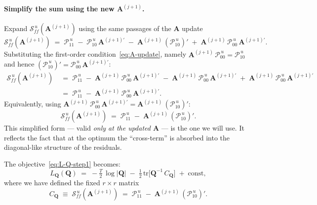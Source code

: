 \documentclass[11pt, a4paper, oneside]{article}
\newcommand{\mA}{\mathbf{A}}
\newcommand{\mQ}{\mathbf{Q}}
\begin{document}
\paragraph{Simplify the sum using the new $\mathbf{A}^{(j+1)}$.}
Expand $\mathcal{S}_{ff}^{\,u}(\mA^{(j+1)})$ using the same passages
of the $\mA$ update
\[
\mathcal{S}_{ff}^{\,u}(\mA^{(j+1)}) \;=\; \mathcal{P}_{11}^{\,u}
\;-\; \mathcal{P}_{10}^{\,u}\, \mA^{(j+1)\prime}
\;-\; \mA^{(j+1)}\, (\mathcal{P}_{10}^{\,u})'
\;+\; \mA^{(j+1)}\, \mathcal{P}_{00}^{\,u}\, \mA^{(j+1)\prime}.
\]
Substituting the first-order condition~\eqref{eq:A-update}, namely
$\mA^{(j+1)}\, \mathcal{P}_{00}^{\,u} = \mathcal{P}_{10}^{\,u}$ and
hence $(\mathcal{P}_{10}^{\,u})' = \mathcal{P}_{00}^{\,u}\, \mA^{(j+1)\prime}$:
\begin{align*}
\mathcal{S}_{ff}^{\,u}(\mA^{(j+1)})
&\;=\; \mathcal{P}_{11}^{\,u}
\;-\; \mA^{(j+1)}\, \mathcal{P}_{00}^{\,u}\, \mA^{(j+1)\prime}
\;-\; \mA^{(j+1)}\, \mathcal{P}_{00}^{\,u}\, \mA^{(j+1)\prime}
\;+\; \mA^{(j+1)}\, \mathcal{P}_{00}^{\,u}\, \mA^{(j+1)\prime} \\[2pt]
&\;=\; \mathcal{P}_{11}^{\,u} \;-\; \mA^{(j+1)}\, \mathcal{P}_{00}^{\,u}\, \mA^{(j+1)\prime}.
\end{align*}
Equivalently, using $\mA^{(j+1)}\, \mathcal{P}_{00}^{\,u}\, \mA^{(j+1)\prime} = \mA^{(j+1)}\, (\mathcal{P}_{10}^{\,u})'$:
\begin{equation}
\mathcal{S}_{ff}^{\,u}(\mA^{(j+1)}) \;=\; \mathcal{P}_{11}^{\,u} \;-\; \mA^{(j+1)}\, (\mathcal{P}_{10}^{\,u})'.
\label{eq:Sff-simplified}
\end{equation}
This simplified form — valid \emph{only at the updated $\mA$} — is the
one we will use. It reflects the fact that at the optimum the
``cross-term'' is absorbed into the diagonal-like structure of the
residuals.

The objective~\eqref{eq:L-Q-step1} becomes:
\[
L_{\mQ}(\mQ) \;=\; -\tfrac{T}{2}\,\log|\mQ| \;-\; \tfrac{1}{2}\,\mathrm{tr}\!\big[\mQ^{-1}\, C_{\mQ}\big]
\;+\; \text{const},
\]
where we have defined the fixed $r \times r$ matrix
\begin{equation}
C_{\mQ} \;\equiv\; \mathcal{S}_{ff}^{\,u}(\mA^{(j+1)}) \;=\; \mathcal{P}_{11}^{\,u} \;-\; \mA^{(j+1)}\, (\mathcal{P}_{10}^{\,u})'.
\label{eq:CQ-definition}
\end{equation}
\end{document}
